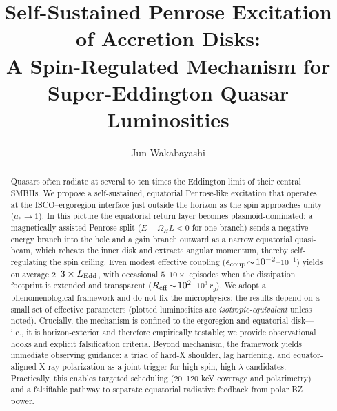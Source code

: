 \documentclass[twocolumn]{aastex701}
\newcommand{\LEdd}{L_{\rm Edd}}
\begin{document}
\title{Self-Sustained Penrose Excitation of Accretion Disks:\\
A Spin-Regulated Mechanism for Super-Eddington Quasar Luminosities}

\author[0009-0008-1891-4579]{Jun Wakabayashi}

\begin{abstract}
Quasars often radiate at several to ten times the Eddington limit of their central SMBHs.
We propose a self-sustained, equatorial Penrose-like excitation that operates at the
ISCO–ergoregion interface just outside the horizon as the spin approaches unity ($a_*\!\to\!1$).
In this picture the equatorial return layer becomes plasmoid-dominated; a magnetically assisted
Penrose split ($E-\Omega_H L<0$ for one branch) sends a negative-energy branch into the hole and a
gain branch outward as a narrow equatorial quasi-beam, which reheats the inner disk and extracts
angular momentum, thereby self-regulating the spin ceiling.
Even modest effective coupling ($\epsilon_{\rm coup}\!\sim\!10^{-2}$–$10^{-1}$) yields on average
$2$–$3\times\LEdd$, with occasional $5$–$10\times$ episodes when the dissipation footprint is extended
and transparent ($R_{\rm eff}\!\sim\!10^{2}$–$10^{3}\,r_g$). We adopt a phenomenological framework and
do not fix the microphysics; the results depend on a small set of effective parameters (plotted
luminosities are \textit{isotropic-equivalent} unless noted). Crucially, the mechanism is confined to
the ergoregion and equatorial disk—i.e., it is horizon-exterior and therefore empirically testable;
we provide observational hooks and explicit falsification criteria.
Beyond mechanism, the framework yields immediate observing guidance: a triad of hard-X shoulder, lag hardening, and equator-aligned X-ray polarization as a joint trigger for high-spin, high-$\lambda$ candidates. Practically, this enables targeted scheduling (20--120 keV coverage and polarimetry) and a falsifiable pathway to separate equatorial radiative feedback from polar BZ power.

\end{abstract}

\end{document}
